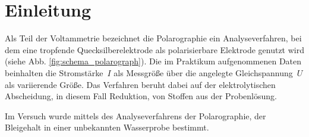 
\section{Einleitung}
\label{sec:einleitung}

Als Teil der Voltammetrie bezeichnet die Polarographie ein Analyseverfahren, bei dem eine tropfende Quecksilberelektrode als polarisierbare Elektrode genutzt wird (siehe Abb. \ref{fig:schema_polarograph}). Die im Praktikum aufgenommenen Daten beinhalten die \mbox{Stromstärke $I$} als Messgröße über die angelegte \mbox{Gleichspannung $U$} als variierende Größe. Das Verfahren beruht dabei auf der elektrolytischen Abscheidung, in diesem Fall Reduktion, von Stoffen aus der Probenlösung.\cite{Brehm.2004}


Im Versuch wurde mittels des Analyseverfahrens der Polarographie, der Bleigehalt in einer unbekannten Wasserprobe bestimmt.
